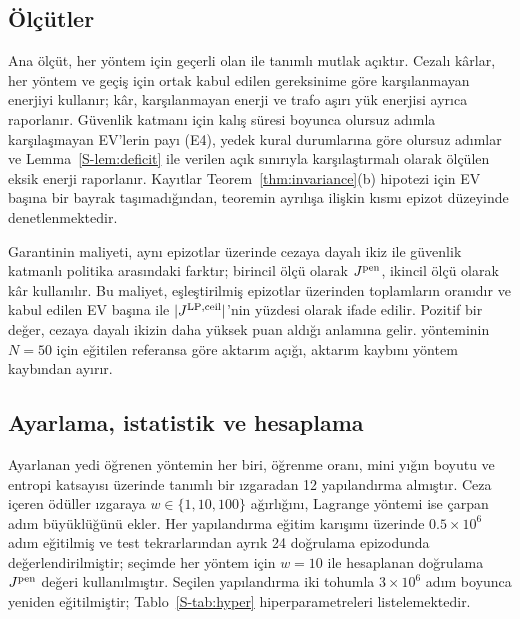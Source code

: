 \subsection{Ölçütler}\label{sec:metrics}

Ana ölçüt, her yöntem için geçerli olan  ile tanımlı mutlak açıktır.
Cezalı kârlar, her yöntem ve geçiş için ortak kabul edilen gereksinime göre karşılanmayan enerjiyi kullanır; kâr, karşılanmayan enerji ve trafo aşırı yük enerjisi ayrıca raporlanır.
Güvenlik katmanı için kalış süresi boyunca olursuz adımla karşılaşmayan EV'lerin payı (E4), yedek kural durumlarına göre olursuz adımlar ve Lemma~\ref{S-lem:deficit} ile verilen açık sınırıyla karşılaştırmalı olarak ölçülen eksik enerji raporlanır.
Kayıtlar Teorem~\ref{thm:invariance}(b) hipotezi için EV başına bir bayrak taşımadığından, teoremin ayrılışa ilişkin kısmı epizot düzeyinde denetlenmektedir.

Garantinin maliyeti, aynı epizotlar üzerinde cezaya dayalı ikiz ile güvenlik katmanlı politika arasındaki farktır; birincil ölçü olarak $J^{\mathrm{pen}}$, ikincil ölçü olarak kâr kullanılır.
Bu maliyet, eşleştirilmiş epizotlar üzerinden toplamların oranıdır ve kabul edilen EV başına \texteuro{} ile $|J^{\mathrm{LP,ceil}}|$'nin yüzdesi olarak ifade edilir.
Pozitif bir değer, cezaya dayalı ikizin daha yüksek puan aldığı anlamına gelir.
\method{} yönteminin $N=50$ için eğitilen referansa göre aktarım açığı, aktarım kaybını yöntem kaybından ayırır.

\subsection{Ayarlama, istatistik ve hesaplama}\label{sec:hyper}

Ayarlanan yedi öğrenen yöntemin her biri, öğrenme oranı, mini yığın boyutu ve entropi katsayısı üzerinde tanımlı bir ızgaradan 12 yapılandırma almıştır.
Ceza içeren ödüller ızgaraya $w\in\{1,10,100\}$ ağırlığını, Lagrange yöntemi ise çarpan adım büyüklüğünü ekler.
Her yapılandırma eğitim karışımı üzerinde $0.5\times10^{6}$ adım eğitilmiş ve test tekrarlarından ayrık 24 doğrulama epizodunda değerlendirilmiştir; seçimde her yöntem için $w=10$ ile hesaplanan doğrulama $J^{\mathrm{pen}}$ değeri kullanılmıştır.
Seçilen yapılandırma iki tohumla $3\times10^{6}$ adım boyunca yeniden eğitilmiştir; Tablo~\ref{S-tab:hyper} hiperparametreleri listelemektedir.

